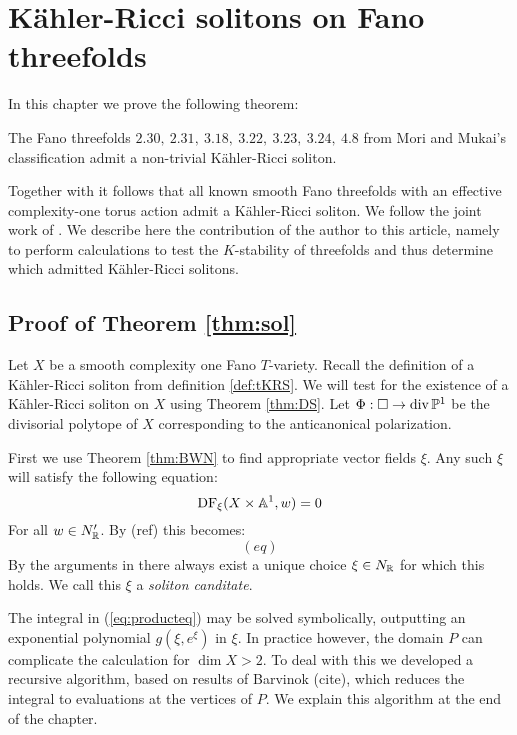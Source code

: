 \chapter{K\"ahler-Ricci solitons on Fano threefolds} \label{chap:sol}



In this chapter we prove the following theorem:
\begin{theorem} \label{thm:sol}
The Fano threefolds \(2.30, \ 2.31, \ 3.18, \ 3.22, \ 3.23, \ 3.24, \ 4.8\) from Mori and Mukai's classification \cite{} admit a non-trivial K\"ahler-Ricci soliton.
\end{theorem}
Together with \cite[Theorems. 6.1, 6.2]{ilten2015} it follows that all known smooth Fano threefolds with an effective complexity-one torus action admit a K\"ahler-Ricci soliton. We follow the joint work of \cite{cable2018classification}. We describe here the contribution of the author to this article, namely to perform calculations to test the \(K\)-stability of threefolds and thus determine which admitted K\"ahler-Ricci solitons.

\section{Proof of Theorem \ref{thm:sol}}

Let \(X\) be a smooth complexity one Fano \(T\)-variety. Recall the definition of a K\"ahler-Ricci soliton from definition \ref{def:tKRS}. We will test for the existence of a K\"ahler-Ricci soliton on \(X\) using Theorem \ref{thm:DS}. Let \(\Phi: \Box \to \operatorname{div} \mathbb{P}^1\) be the divisorial polytope of \(X\) corresponding to the anticanonical polarization. 

First we use Theorem \ref{thm:BWN} to find appropriate vector fields \(\xi\). Any such \(\xi\) will satisfy the following equation: 
\begin{equation} \label{eq:producteq}
\mathop{\rm DF}\nolimits_{\xi}(X \times \mathbb{A}^1, w) = 0
\end{equation}
For all \(w \in N'_{\mathbb{R}}\). By (ref) this becomes:
\begin{equation} \label{eq:combproducteq}
(eq)
\end{equation}
By the arguments in \cite[Section~3.1]{donaldson2008kahler} there always exist a unique choice $\xi \in N_{\mathbb{R}}$ for which this holds. We call this $\xi$ a \textit{soliton canditate}.

The integral in (\ref{eq:producteq}) may be solved symbolically, outputting an exponential polynomial \(g(\xi, e^{\xi})\) in \(\xi\). In practice however, the domain \(P\) can complicate the calculation for \(\dim X > 2\). To deal with this we developed a recursive algorithm, based on results of Barvinok (cite), which reduces the integral to evaluations at the vertices of \(P\). We explain this algorithm at the end of the chapter.

